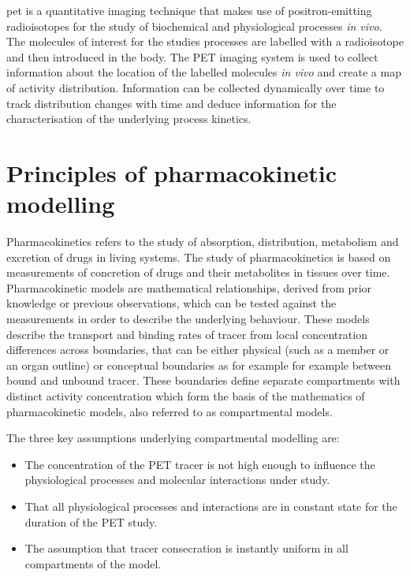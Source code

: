 \Gls{pet} is a quantitative imaging technique that makes use of 
positron-emitting radioisotopes for the study of biochemical and physiological processes \textit{in vivo}. The molecules of interest for the studies processes are labelled with a radioisotope and then introduced in the body. The PET imaging system is used to collect information about the location of the labelled molecules \textit{in vivo} and create a map of activity distribution. Information can be collected dynamically over time to track distribution changes with time and deduce information for the characterisation of the underlying process kinetics. 

\section{Principles of pharmacokinetic modelling}
Pharmacokinetics refers to the study of absorption, distribution, metabolism and excretion of drugs in living systems. The study of pharmacokinetics is based on measurements of concretion of drugs and their metabolites in tissues over time. Pharmacokinetic models are mathematical relationships, derived from prior knowledge or previous observations, which can be tested against the measurements in order to describe the underlying behaviour. These models describe the transport and binding rates of tracer from local concentration differences across boundaries, that can be either physical (such as a member or an organ outline) or conceptual boundaries as for example for example between bound and unbound tracer. These boundaries define separate compartments with distinct activity concentration which form the basis of the mathematics of pharmacokinetic models, also referred to as compartmental models.\par
\iffalse 
There are three assumptions are made for compartmental modelling to be valid:
The first is the tracer assumption which requires that the presence of the tracer in PET studies is not influencing the physiological processes and molecular interactions. This is the case in most PET studies as the specific activity of the tracer (Activity/tracer concentration) is kept low. The second assumption is that the physiological processes and molecular interactions are in constant state during the duration of the PET study. The third and final assumption is that tracer is homogeneously distributed within each compartment. 
\fi

The three key assumptions underlying compartmental modelling are:
\begin{itemize}
\item  The concentration of the PET tracer is not high enough to influence the physiological processes and molecular interactions under study. 
\item That all physiological processes and interactions are in constant state for the duration of the PET study. 
\item  The assumption that tracer consecration is instantly uniform in all compartments of the model.
\end{itemize}

